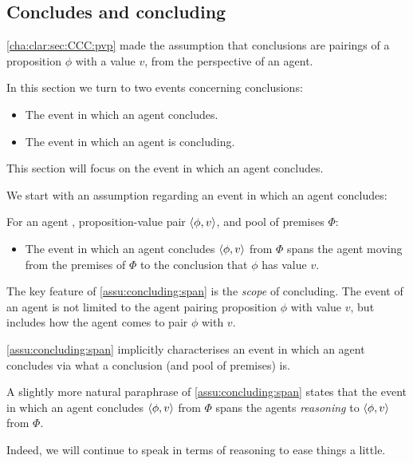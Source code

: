 \subsection{Concludes and concluding}
\label{cha:clar:sec:CCC:c-and-c}

\begin{note}
  \autoref{cha:clar:sec:CCC:pvp} made the assumption that conclusions are pairings of a proposition \(\phi\) with a value \(v\), from the perspective of an agent.

  In this section we turn to two events concerning conclusions:
  \begin{itemize}
  \item
    The event in which an agent concludes.
  \item
    The event in which an agent is concluding.
  \end{itemize}
  This section will focus on the event in which an agent concludes.
\end{note}

\begin{note}
  We start with an assumption regarding an event in which an agent concludes:

  \begin{assumption}
    \label{assu:concluding:span}
    For an agent \vAgent{}, proposition-value pair \(\langle \phi, v \rangle\), and pool of premises \(\Phi\):

    \begin{itemize}
    \item
      The event in which an agent concludes \(\langle \phi, v \rangle\) from \(\Phi\) spans the agent moving from the premises of \(\Phi\) to the conclusion that \(\phi\) has value \(v\).
    \end{itemize}
    \vspace{-\baselineskip}
  \end{assumption}

  The key feature of \autoref{assu:concluding:span}  is the \emph{scope} of concluding.
  The event of an agent is not limited to the agent pairing proposition \(\phi\) with value \(v\), but includes how the agent comes to pair \(\phi\) with \(v\).

  \autoref{assu:concluding:span} implicitly characterises an event in which an agent concludes via what a conclusion (and pool of premises) is.

  A slightly more natural paraphrase of \autoref{assu:concluding:span} states that the event in which an agent concludes \(\langle \phi, v \rangle\) from \(\Phi\) spans the agents \emph{reasoning} to \(\langle \phi, v \rangle\) from \(\Phi\).

  Indeed, we will continue to speak in terms of reasoning to ease things a little.
\end{note}

